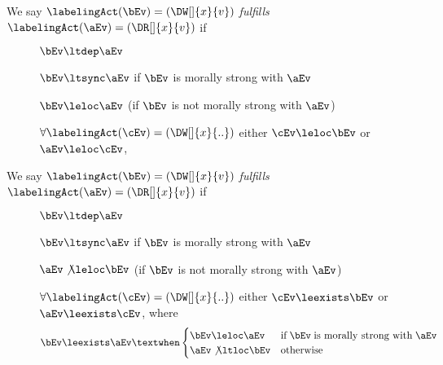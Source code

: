 \begin{definition}
  We say $\labelingAct(\bEv)=(\DW[]{x}{v})$ \emph{fulfills}
  $\labelingAct(\aEv)=(\DR[]{x}{v})$ if
  \begin{description}
  \item[{}{}]
    $\bEv \ltdep \aEv$
  \item[{}]
    $\bEv \ltsync \aEv$ if $\bEv$ is morally strong with $\aEv$
  \item[{}]
    $\bEv \leloc \aEv$ (if $\bEv$ is not morally strong with $\aEv$)
  \item[{}]
    $\forall\labelingAct(\cEv)=(\DW[]{x}{..})$ either $\cEv \leloc \bEv$ or
    $\aEv \leloc \cEv$,
  \end{description}  
\end{definition}
  
\begin{definition}
  We say $\labelingAct(\bEv)=(\DW[]{x}{v})$ \emph{fulfills}
  $\labelingAct(\aEv)=(\DR[]{x}{v})$ if
  \begin{description}
  \item[{}{}]
    $\bEv \ltdep \aEv$
  \item[{}]
    $\bEv \ltsync \aEv$ if $\bEv$ is morally strong with $\aEv$
  \item[{}]
    $\aEv \not\leloc \bEv$ (if $\bEv$ is not morally strong with $\aEv$)
  \item[{}]
    $\forall\labelingAct(\cEv)=(\DW[]{x}{..})$ either $\cEv \leexists \bEv$ or
    $\aEv \leexists \cEv$,
    where
  \begin{align*}
    \bEv\leexists\aEv &\textwhen                      
    \begin{cases}
      \bEv\leloc\aEv &\text{if}\; \bEv \;\text{is morally strong with}\;
      \aEv %
      \\
      \aEv\not\ltloc\bEv &\text{otherwise}
    \end{cases}
  \end{align*}    
  \end{description}  
\end{definition}

